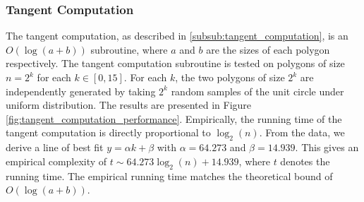 \documentclass{article}
\newcommand{\figref}[1]{Figure \ref{#1}}
\begin{document}
\subsubsection{Tangent Computation}

The tangent computation, as described in \ref{subsub:tangent_computation}, is an $O(\log(a + b))$ subroutine, where $a$ and $b$ are the sizes of each polygon respectively. The tangent computation subroutine is tested on polygons of size $n = 2^k$ for each $k \in [0, 15]$. For each $k$, the two polygons of size $2^k$ are independently generated by taking $2^k$ random samples of the unit circle under uniform distribution. The results are presented in \figref{fig:tangent_computation_performance}. Empirically, the running time of the tangent computation is directly proportional to $\log_2(n)$. From the data, we derive a line of best fit $y = \alpha k + \beta$ with $\alpha = 64.273$ and $\beta = 14.939$. This gives an empirical complexity of $t \sim 64.273 \log_2 (n) + 14.939$, where $t$ denotes the running time. The empirical running time matches the theoretical bound of $O(\log(a+b))$.
\end{document}
